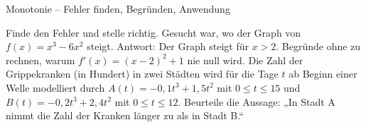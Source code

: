 \begin{aufgabe}{Monotonie – Fehler finden, Begründen, Anwendung}
\begin{teile}
\teil Finde den Fehler und stelle richtig. Gesucht war, wo der Graph von $f(x) = x^3 - 6x^2$ steigt.  Antwort: Der Graph steigt für $x > 2$.
\teil Begründe ohne zu rechnen, warum $f'(x) = (x - 2)^2 + 1$ nie null wird.
\teil Die Zahl der Grippekranken (in Hundert) in zwei Städten wird für die Tage $t$ ab Beginn einer Welle modelliert durch $A(t) = -0{,}1t^3 + 1{,}5t^2$ mit $0 \le t \le 15$ und $B(t) = -0{,}2t^3 + 2{,}4t^2$ mit $0 \le t \le 12$. Beurteile die Aussage: „In Stadt A nimmt die Zahl der Kranken länger zu als in Stadt B.“
\end{teile}
\end{aufgabe}

